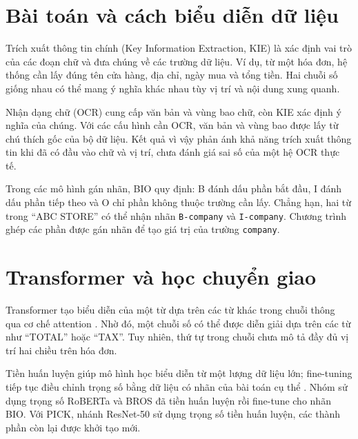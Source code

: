 \section{Bài toán và cách biểu diễn dữ liệu}
Trích xuất thông tin chính (Key Information Extraction, KIE) là xác định vai trò của các đoạn chữ và đưa chúng về các trường dữ liệu. Ví dụ, từ một hóa đơn, hệ thống cần lấy đúng tên cửa hàng, địa chỉ, ngày mua và tổng tiền. Hai chuỗi số giống nhau có thể mang ý nghĩa khác nhau tùy vị trí và nội dung xung quanh.

Nhận dạng chữ (OCR) cung cấp văn bản và vùng bao chữ, còn KIE xác định ý nghĩa của chúng. Với các cấu hình cần OCR, văn bản và vùng bao được lấy từ chú thích gốc của bộ dữ liệu. Kết quả vì vậy phản ánh khả năng trích xuất thông tin khi đã có đầu vào chữ và vị trí, chưa đánh giá sai số của một hệ OCR thực tế.

Trong các mô hình gán nhãn, BIO quy định: B đánh dấu phần bắt đầu, I đánh dấu phần tiếp theo và O chỉ phần không thuộc trường cần lấy. Chẳng hạn, hai từ trong ``ABC STORE'' có thể nhận nhãn \texttt{B-company} và \texttt{I-company}. Chương trình ghép các phần được gán nhãn để tạo giá trị của trường \texttt{company}.

\section{Transformer và học chuyển giao}
Transformer tạo biểu diễn của một từ dựa trên các từ khác trong chuỗi thông qua cơ chế attention \parencite{vaswani2017}. Nhờ đó, một chuỗi số có thể được diễn giải dựa trên các từ như ``TOTAL'' hoặc ``TAX''. Tuy nhiên, thứ tự trong chuỗi chưa mô tả đầy đủ vị trí hai chiều trên hóa đơn.

Tiền huấn luyện giúp mô hình học biểu diễn từ một lượng dữ liệu lớn; fine-tuning tiếp tục điều chỉnh trọng số bằng dữ liệu có nhãn của bài toán cụ thể \parencite{devlin2019}. Nhóm sử dụng trọng số RoBERTa và BROS đã tiền huấn luyện rồi fine-tune cho nhãn BIO. Với PICK, nhánh ResNet-50 sử dụng trọng số tiền huấn luyện, các thành phần còn lại được khởi tạo mới.
